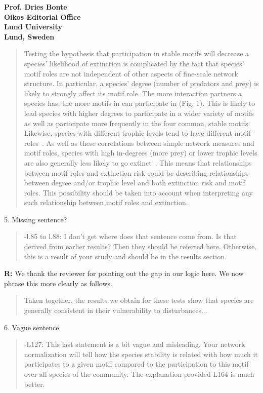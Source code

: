 \documentclass[12pt]{letter}
\begin{document}
\begin{letter}{\bf Prof. Dries Bonte\\
Oikos Editorial Office \\
Lund University \\
Lund, Sweden}
        \begin{quotation}
            Testing the hypothesis that participation in stable motifs will decrease a species' likelihood of extinction is complicated by the fact that species' motif roles are not independent of other aspects of fine-scale network structure. 
            In particular, a species' degree (number of predators and prey) is likely to strongly affect its motif role.
            The more interaction partners a species has, the more motifs in can participate in (Fig. 1).
            This is likely to lead species with higher degrees to participate in a wider variety of motifs as well as participate more frequently in the four common, stable motifs.
            Likewise, species with different trophic levels tend to have different motif roles~\citep{Cirtwill2018EcolLett}.
            As well as these correlations between simple network measures and motif roles, species with high in-degrees (more prey) or lower trophic levels are also generally less likely to go extinct~\citep{Cirtwill2018FoodWebs}.
            This means that relationships between motif roles and extinction risk could be describing relationships between degree and/or trophic level and both extinction risk and motif roles.
            This possibility should be taken into account when interpreting any such relationship between motif roles and extinction.
        \end{quotation}
      

    5. Missing sentence?

    \begin{quotation}
      -l.85 to l.88: I don't get where does that sentence come from. Is that derived from earlier results? Then they should be referred here. Otherwise, this is a result of your study and should be in the results section.
    \end{quotation}

      \textbf{R:} 
     We thank the reviewer for pointing out the gap in our logic here. We now phrase this more clearly as follows.
      
     \begin{quotation}
         Taken together, the results we obtain for these tests show that species are generally consistent in their vulnerability to disturbances...
     \end{quotation}


    6. Vague sentence

    \begin{quotation}
      -L127: This last statement is a bit vague and misleading. Your network normalization will tell how the species stability is related with how much it participates to a given motif compared to the participation to this motif over all species of the community. The explanation provided L164 is much better.
    \end{quotation}


\end{letter}
\end{document}

